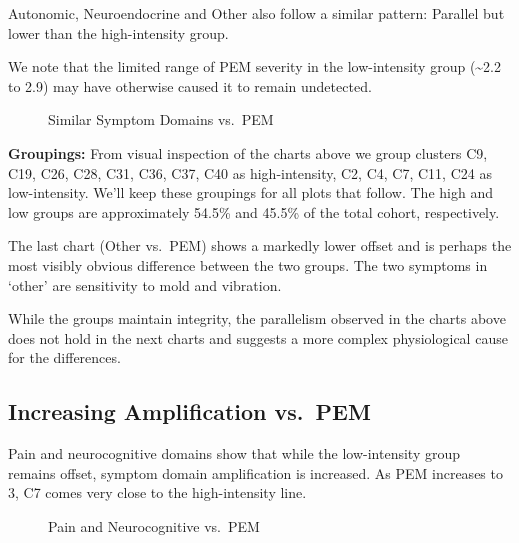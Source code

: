 \documentclass[
  letterpaper,
  DIV=11,
  numbers=noendperiod]{scrartcl}
\begin{document}
Autonomic, Neuroendocrine and Other also follow a similar pattern:
Parallel but lower than the high-intensity group.

We note that the limited range of PEM severity in the low-intensity
group (\textasciitilde2.2 to 2.9) may have otherwise caused it to remain
undetected.

\begin{figure}[h]


\caption{\label{fig-symptoms}Similar Symptom Domains vs.~PEM}

\end{figure}%

\FloatBarrier

\textbf{Groupings:} From visual inspection of the charts above we group
clusters C9, C19, C26, C28, C31, C36, C37, C40 as high-intensity, C2,
C4, C7, C11, C24 as low-intensity. We'll keep these groupings for all
plots that follow. The high and low groups are approximately 54.5\% and
45.5\% of the total cohort, respectively.

The last chart (Other vs.~PEM) shows a markedly lower offset and is
perhaps the most visibly obvious difference between the two groups. The
two symptoms in `other' are sensitivity to mold and vibration.

\FloatBarrier

While the groups maintain integrity, the parallelism observed in the
charts above does not hold in the next charts and suggests a more
complex physiological cause for the differences.

\subsection{Increasing Amplification
vs.~PEM}\label{increasing-amplification-vs.-pem}

Pain and neurocognitive domains show that while the low-intensity group
remains offset, symptom domain amplification is increased. As PEM
increases to 3, C7 comes very close to the high-intensity line.

\begin{figure}[h]


\caption{\label{fig-pain}Pain and Neurocognitive vs.~PEM}

\end{figure}%
\end{document}
